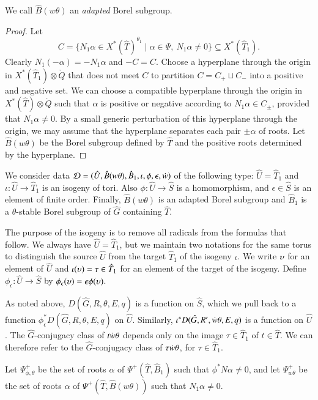 We call $\hat B(w\theta)$ an {\it adapted} Borel subgroup.

\begin{proof}  Let 
\[
C = \{N_1\alpha\in X^*(\hat T)^{\theta_1} \mid \alpha\in\Psi,\ N_1\alpha\ne 0\}
\subseteq X^*(\hat T_1).
\]
Clearly $N_1(-\alpha)= - N_1\alpha$ and $-C = C$.  Choose a hyperplane
through the origin in $X^*(\hat T_1)\otimes\ring{Q}$ that does not
meet $C$ to partition $C = C_+ \sqcup C_-$ into a positive and
negative set.  We can choose a compatible hyperplane through the
origin in $X^*(\hat T)\otimes\ring{Q}$ such that $\alpha$ is positive
or negative according to $N_1\alpha\in C_\pm$, provided that
$N_1\alpha\ne 0$.  By a small generic perturbation of this hyperplane
through the origin, we may assume that the hyperplane separates each
pair $\pm \alpha$ of roots. 
Let $\hat B(w\theta)$ be the Borel subgroup defined by $\hat T$ and
the positive roots determined by the hyperplane.
\end{proof}

We consider data $\mathcal D=(\hat U,\hat B(w\theta),\hat
B_1,\iota,\phi,\epsilon,\dot w)$ of the following type: $\hat U = \hat
T_1$ and $\iota:\hat U\to \hat T_1$ is an isogeny of tori.  Also
$\phi:\hat U\to \hat S$ is a homomorphism, and $\epsilon\in \hat S$ is
an element of finite order.  Finally, $\hat B(w\theta)$ is an
adapted Borel subgroup and $\hat B_1$ is a $\theta$-stable
Borel subgroup of $\hat G$ containing $\hat T$.

The purpose of the isogeny is to remove all radicals from the formulas
that follow.  We always have $\hat U = \hat T_1$, but we maintain two
notations for the same torus to distinguish the source $\hat U$ from
the target $\hat T_1$ of the isogeny $\iota$.  We write $\upsilon$ for an
element of $\hat U$ and $\iota(\upsilon)=\tau\in \hat T_1$ for an element
of the target of the isogeny.  Define $\phi_\epsilon:\hat U\to\hat S$
by $\phi_\epsilon(\upsilon)= \epsilon\phi(\upsilon)$.

As noted above, $D(\hat G,R,\theta,E,q)$ is a function on $\hat S$,
which we pull back to a function $\phi^*_\epsilon D(\hat
G,R,\theta,E,q)$ on $\hat U$.  Similarly, $\iota^* D(\hat G,R',\dot w
\theta,E,q)$ is a function on $\hat U$.  The $\hat G$-conjugacy class
of $t\dot w \theta$ depends only on the image $\tau\in \hat T_1$ of
$t\in \hat T$.  We can therefore refer to the $\hat G$-conjugacy class
of $\tau\dot w\theta$, for $\tau\in \hat T_1$.

Let $\Psi_{\phi,\theta}^+$ be the set of roots $\alpha$ of
  $\Psi^+(\hat T,\hat B_1)$ such that $\phi^*N\alpha\ne 0$, and let
  $\Psi_{w\theta}^+$ 
be the set of roots $\alpha$ of $\Psi^+(\hat T,\hat B(w\theta))$ such
  that $N_1\alpha\ne0$.  

